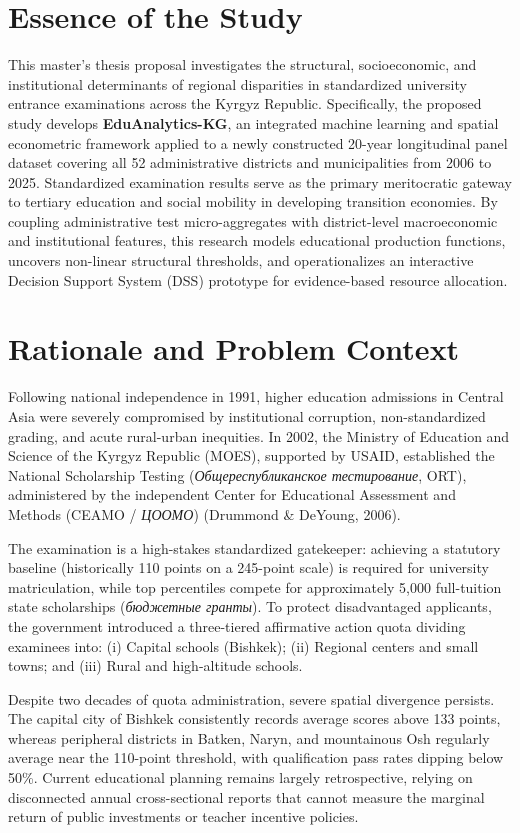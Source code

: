 \documentclass[12pt,letterpaper]{report}
\begin{document}
\section{Essence of the Study}
This master's thesis proposal investigates the structural, socioeconomic, and institutional determinants of regional disparities in standardized university entrance examinations across the Kyrgyz Republic. Specifically, the proposed study develops \textbf{EduAnalytics-KG}, an integrated machine learning and spatial econometric framework applied to a newly constructed 20-year longitudinal panel dataset covering all 52 administrative districts and municipalities from 2006 to 2025. Standardized examination results serve as the primary meritocratic gateway to tertiary education and social mobility in developing transition economies. By coupling administrative test micro-aggregates with district-level macroeconomic and institutional features, this research models educational production functions, uncovers non-linear structural thresholds, and operationalizes an interactive Decision Support System (DSS) prototype for evidence-based resource allocation.

\section{Rationale and Problem Context}
Following national independence in 1991, higher education admissions in Central Asia were severely compromised by institutional corruption, non-standardized grading, and acute rural-urban inequities. In 2002, the Ministry of Education and Science of the Kyrgyz Republic (MOES), supported by USAID, established the National Scholarship Testing (\textit{Общереспубликанское тестирование}, ORT), administered by the independent Center for Educational Assessment and Methods (CEAMO / \textit{ЦООМО}) (Drummond \& DeYoung, 2006).

The examination is a high-stakes standardized gatekeeper: achieving a statutory baseline (historically 110 points on a 245-point scale) is required for university matriculation, while top percentiles compete for approximately 5,000 full-tuition state scholarships (\textit{бюджетные гранты}). To protect disadvantaged applicants, the government introduced a three-tiered affirmative action quota dividing examinees into: (i) Capital schools (Bishkek); (ii) Regional centers and small towns; and (iii) Rural and high-altitude schools.

Despite two decades of quota administration, severe spatial divergence persists. The capital city of Bishkek consistently records average scores above 133 points, whereas peripheral districts in Batken, Naryn, and mountainous Osh regularly average near the 110-point threshold, with qualification pass rates dipping below 50\%. Current educational planning remains largely retrospective, relying on disconnected annual cross-sectional reports that cannot measure the marginal return of public investments or teacher incentive policies.
\end{document}

